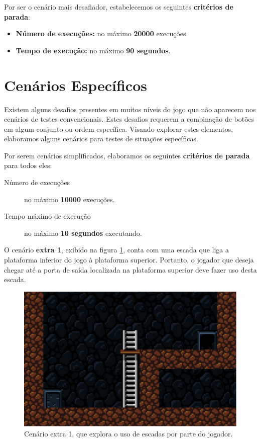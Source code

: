 Por ser o cenário mais desafiador, estabelecemos os seguintes \textbf{critérios
de parada}:

\begin{itemize}
	\item \textbf{Número de execuções:} no máximo \textbf{20000} execuções.
	\item \textbf{Tempo de execução:} no máximo \textbf{90 segundos}.
\end{itemize}


\section{Cenários Específicos}

Existem alguns desafios presentes em muitos níveis do jogo que não aparecem nos
cenários de testes convencionais. Estes desafios requerem a combinação de botões
em algum conjunto ou ordem específica. Visando explorar estes elementos,
elaboramos alguns cenários para testes de situações específicas.

Por serem cenários simplificados, elaboramos os seguintes \textbf{critérios de
parada} para todos eles:

\begin{description}
    \item [Número de execuções] no máximo \textbf{10000} execuções.
    \item [Tempo máximo de execução] no máximo \textbf{10 segundos} executando.
\end{description}

O cenário \textbf{extra 1}, exibido na figura \ref{fig:extra1}, conta com uma
escada que liga a plataforma inferior do jogo à plataforma superior. Portanto,
o jogador que deseja chegar até a porta de saída localizada na plataforma
superior deve fazer uso desta escada.

\begin{figure}[H]
\centering
\includegraphics[width=\textwidth / 2]{fig/levels/extra1.pdf}
\caption{Cenário extra 1, que explora o uso de escadas por parte do jogador.}
\label{fig:extra1}
\end{figure}

